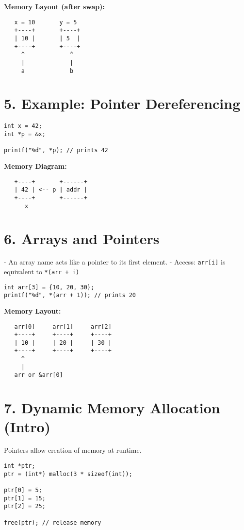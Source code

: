 \documentclass[a4paper,12pt]{article}
\begin{document}
\textbf{Memory Layout (after swap):}
\begin{verbatim}
   x = 10       y = 5
   +----+       +----+
   | 10 |       | 5  |
   +----+       +----+
     ^             ^
     |             |
     a             b
\end{verbatim}

\section*{5. Example: Pointer Dereferencing}
\begin{lstlisting}
int x = 42;
int *p = &x;

printf("%d", *p); // prints 42
\end{lstlisting}

\textbf{Memory Diagram:}
\begin{verbatim}
   +----+       +------+
   | 42 | <-- p | addr |
   +----+       +------+
      x
\end{verbatim}

\section*{6. Arrays and Pointers}
- An array name acts like a pointer to its first element.  
- Access: \verb|arr[i]| is equivalent to \verb|*(arr + i)|  

\begin{lstlisting}
int arr[3] = {10, 20, 30};
printf("%d", *(arr + 1)); // prints 20
\end{lstlisting}

\textbf{Memory Layout:}
\begin{verbatim}
   arr[0]     arr[1]     arr[2]
   +----+     +----+     +----+
   | 10 |     | 20 |     | 30 |
   +----+     +----+     +----+
     ^ 
     |
   arr or &arr[0]
\end{verbatim}

\section*{7. Dynamic Memory Allocation (Intro)}
Pointers allow creation of memory at runtime.  

\begin{lstlisting}
int *ptr;
ptr = (int*) malloc(3 * sizeof(int));

ptr[0] = 5;
ptr[1] = 15;
ptr[2] = 25;

free(ptr); // release memory
\end{lstlisting}
\end{document}
